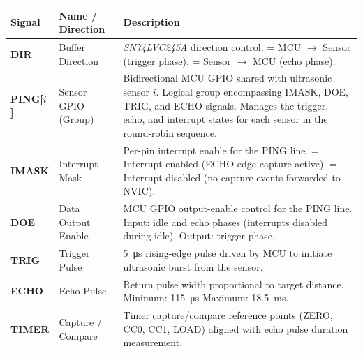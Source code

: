 \documentclass[12pt]{article}
\begin{document}
\begingroup\scriptsize
\vspace{4pt}
\begin{center}
\renewcommand{\arraystretch}{1.2}
\begin{tabularx}{\linewidth}{@{} l l Y @{}}
\toprule
\textbf{Signal} & \textbf{Name / Direction} & \textbf{Description} \\
\midrule
\textbf{DIR} & Buffer Direction &
\textit{SN74LVC245A} direction control. = MCU $\rightarrow$ Sensor (trigger phase). = Sensor $\rightarrow$ MCU (echo phase).\\[3pt]
\hline
\textbf{PING[$i$]} & Sensor GPIO (Group) &
Bidirectional MCU GPIO shared with ultrasonic sensor $i$.\newline
Logical group encompassing IMASK, DOE, TRIG, and ECHO signals.\newline
Manages the trigger, echo, and interrupt states for each sensor in the round-robin sequence.\\[3pt]
\hline
\textbf{IMASK} & Interrupt Mask &
Per-pin interrupt enable for the PING line. = Interrupt enabled (ECHO edge capture active). = Interrupt disabled (no capture events forwarded to NVIC).\\[3pt]
\hline
\textbf{DOE} & Data Output Enable &
MCU GPIO output-enable control for the PING line.\newline
Input: idle and echo phases (interrupts disabled during idle).\newline
Output: trigger phase.\\[3pt]
\hline
\textbf{TRIG} & Trigger Pulse &
\SI{5}{\micro\second} rising-edge pulse driven by MCU to initiate ultrasonic burst from the sensor.\\[3pt]
\hline
\textbf{ECHO} & Echo Pulse &
Return pulse width proportional to target distance.\newline
Minimum: \SI{115}{\micro\second}\newline
Maximum: \SI{18.5}{\milli\second}.\\[3pt]
\hline
\textbf{TIMER} & Capture / Compare &
Timer capture/compare reference points (ZERO, CC0, CC1, LOAD) aligned with echo pulse duration measurement.\\
\bottomrule
\end{tabularx}
\end{center}
\endgroup
\end{document}
